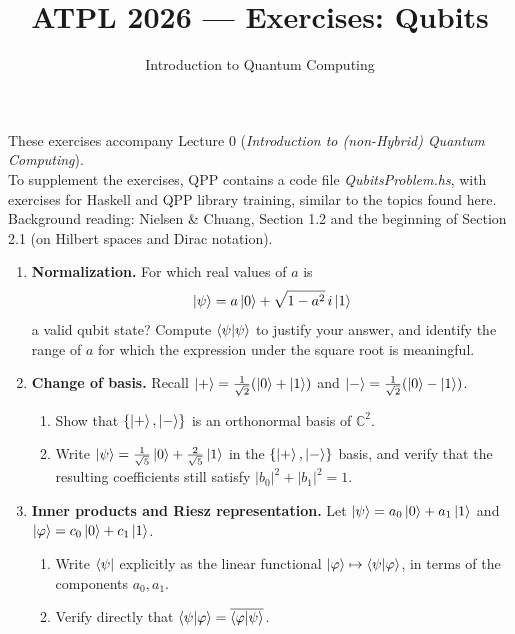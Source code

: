 \documentclass[11pt]{article}
\title{ATPL 2026 --- Exercises: Qubits}
\author{Introduction to Quantum Computing}
\date{}
\begin{document}
\maketitle

\noindent These exercises accompany Lecture 0 (\emph{Introduction to (non-Hybrid)
Quantum Computing}).\\ 

\noindent To supplement the exercises, QPP contains a code file \textit{QubitsProblem.hs}, with exercises for Haskell and QPP library training, similar to the topics found here.\\

\noindent Background reading: Nielsen \& Chuang, Section 1.2 and the beginning of Section 2.1 (on Hilbert spaces and Dirac notation).

\begin{enumerate}[label=\textbf{Exercise \arabic*.}, leftmargin=2.2cm]

\item \textbf{Normalization.}
For which real values of $a$ is
\[
\ket{\psi} = a \ket{0} + \sqrt{1-a^2}\, i \ket{1}
\]
a valid qubit state? Compute $\braket{\psi}{\psi}$ to justify your answer,
and identify the range of $a$ for which the expression under the square
root is meaningful.

\item \textbf{Change of basis.}
Recall $\ket{+} = \tfrac{1}{\sqrt2}(\ket0+\ket1)$ and
$\ket{-} = \tfrac1{\sqrt2}(\ket0-\ket1)$.
\begin{enumerate}[label=(\alph*)]
\item Show that $\{\ket{+},\ket{-}\}$ is an orthonormal basis of
$\mathbb{C}^2$.
\item Write $\ket{\psi} = \tfrac{1}{\sqrt5}\ket0 + \tfrac{2}{\sqrt5}\ket1$
in the $\{\ket+,\ket-\}$ basis, and verify that the resulting coefficients
still satisfy $|b_0|^2+|b_1|^2=1$.
\end{enumerate}

\item \textbf{Inner products and Riesz representation.}
Let $\ket{\psi} = a_0\ket0+a_1\ket1$ and $\ket{\varphi}=c_0\ket0+c_1\ket1$.
\begin{enumerate}[label=(\alph*)]
\item Write $\bra\psi$ explicitly as the linear functional
$\ket\varphi \mapsto \braket{\psi}{\varphi}$, in terms of the components
$a_0,a_1$.
\item Verify directly that $\braket{\psi}{\varphi} =
\overline{\braket{\varphi}{\psi}}$.
\end{enumerate}


\end{enumerate}
\end{document}
